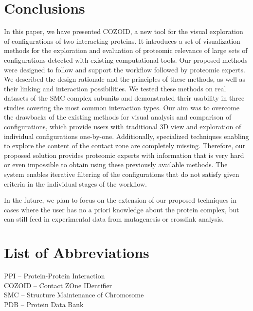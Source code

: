 \documentclass{bmcart}
\begin{document}
\section*{Conclusions}
In this paper, we have presented COZOID, a new tool for the visual exploration of configurations of two interacting proteins. 
It introduces a set of visualization methods for the exploration and evaluation of proteomic relevance of large sets of configurations detected with existing computational tools.
Our proposed methods were designed to follow and support the workflow followed by proteomic experts.
We described the design rationale and the principles of these methods, as well as their linking and interaction possibilities. 
We tested these methods on real datasets of the SMC complex subunits and demonstrated their usability in three studies covering the most common interaction types.
Our aim was to overcome the drawbacks of the existing methods for visual analysis and comparison of configurations, which provide users with traditional 3D view and exploration of individual configurations one-by-one.
Additionally, specialized techniques enabling to explore the content of the contact zone are completely missing. 
Therefore, our proposed solution provides proteomic experts with information that is very hard or even impossible to obtain using these previously available methods.
The system enables iterative filtering of the configurations that do not satisfy given criteria in the individual stages of the workflow.

In the future, we plan to focus on the extension of our proposed techniques in cases where the user has no a priori knowledge about the protein complex, but can still feed in experimental data from mutagenesis or crosslink analysis.

\section*{List of Abbreviations}
\begin{backmatter}
PPI -- Protein-Protein Interaction \\
COZOID -- Contact ZOne IDentifier \\
SMC -- Structure Maintenance of Chromosome \\
PDB -- Protein Data Bank \\
\end{backmatter}
\end{document}
